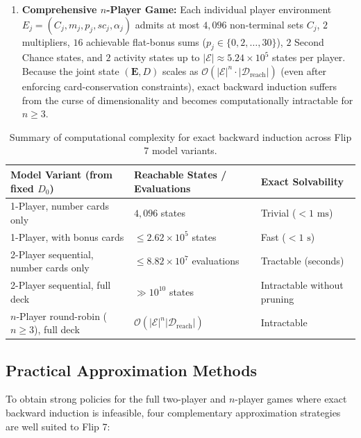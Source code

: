 \documentclass{article}
\theoremstyle{plain}
\theoremstyle{definition}
\theoremstyle{remark}
\begin{document}
\begin{enumerate}
    \item \textbf{Comprehensive $n$-Player Game:} Each individual player environment $E_j = (C_j, m_j, p_j, sc_j, \alpha_j)$ admits at most $4{,}096$ non-terminal sets $C_j$, $2$ multipliers, $16$ achievable flat-bonus sums ($p_j \in \{0, 2, \dots, 30\}$), $2$ Second Chance states, and $2$ activity states up to $|\mathcal{E}| \approx 5.24 \times 10^{5}$ states per player. Because the joint state $(\mathbf{E}, D)$ scales as $\mathcal{O}(|\mathcal{E}|^{n} \cdot |\mathcal{D}_{\text{reach}}|)$ (even after enforcing card-conservation constraints), exact backward induction suffers from the curse of dimensionality and becomes computationally intractable for $n \ge 3$.
\end{enumerate}

\begin{table}[h]
\centering
\begin{tabular}{l l l}
\hline
\textbf{Model Variant (from fixed $D_0$)} & \textbf{Reachable States / Evaluations} & \textbf{Exact Solvability} \\
\hline
1-Player, number cards only & $4{,}096$ states & Trivial ($< 1\text{ ms}$) \\
1-Player, with bonus cards & $\le 2.62 \times 10^{5}$ states & Fast ($< 1\text{ s}$) \\
2-Player sequential, number cards only & $\le 8.82 \times 10^{7}$ evaluations & Tractable (seconds) \\
2-Player sequential, full deck & $\gg 10^{10}$ states & Intractable without pruning \\
$n$-Player round-robin ($n \ge 3$), full deck & $\mathcal{O}(|\mathcal{E}|^{n} |\mathcal{D}_{\text{reach}}|)$ & Intractable \\
\hline
\end{tabular}
\caption{Summary of computational complexity for exact backward induction across Flip 7 model variants.}
\label{tab:complexity}
\end{table}

\subsection{Practical Approximation Methods}
To obtain strong policies for the full two-player and $n$-player games where exact backward induction is infeasible, four complementary approximation strategies are well suited to Flip 7:
\end{document}
